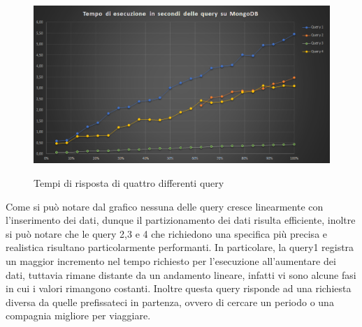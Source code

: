 \documentclass[12pt]{article}
\begin{document}
\begin{figure}[H]
\begin{center}
  \includegraphics[scale = 0.52]{img/dataMan/QueryTime.png}\\
  \caption{Tempi di risposta di quattro differenti query\protect\footnotemark }
\end{center}
\end{figure}

\noindent Come si può notare dal grafico nessuna delle query cresce linearmente con l'inserimento dei dati, dunque il partizionamento dei dati risulta efficiente, inoltre si può notare che le query 2,3 e 4 che richiedono una specifica più precisa e realistica risultano particolarmente performanti. In particolare, la query1 registra un maggior incremento nel tempo richiesto per l'esecuzione all'aumentare dei dati, tuttavia rimane distante da un andamento lineare, infatti vi sono alcune fasi in cui i valori rimangono costanti. Inoltre questa query risponde ad una richiesta diversa da quelle prefissateci in partenza, ovvero di cercare un periodo o una compagnia migliore per viaggiare.
\end{document}
